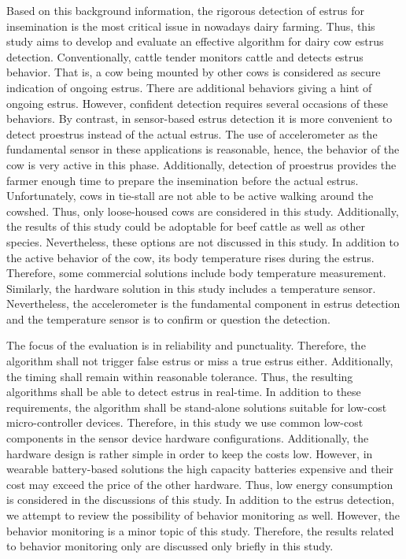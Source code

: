 \documentclass[english,12pt,a4paper,pdftex,elec,utf8]{aaltothesis}
\begin{document}
Based on this background information, the rigorous detection of estrus for insemination is the most critical issue in nowadays dairy farming. Thus, this study aims to develop and evaluate an effective algorithm for dairy cow estrus detection. Conventionally, cattle tender monitors cattle and detects estrus behavior. That is, a cow being mounted by other cows is considered as secure indication of ongoing estrus. There are additional behaviors giving a hint of ongoing estrus. However, confident detection requires several occasions of these behaviors. By contrast, in sensor-based estrus detection it is more convenient to detect proestrus instead of the actual estrus. The use of accelerometer as the fundamental sensor in these applications is reasonable, hence, the behavior of the cow is very active in this phase. Additionally, detection of proestrus provides the farmer enough time to prepare the insemination before the actual estrus. Unfortunately, cows in tie-stall are not able to be active walking around the cowshed. Thus, only loose-housed cows are considered in this study. Additionally, the results of this study could be adoptable for beef cattle as well as other species. Nevertheless, these options are not discussed in this study. In addition to the active behavior of the cow, its body temperature rises during the estrus. Therefore, some commercial solutions include body temperature measurement. Similarly, the hardware solution in this study includes a temperature sensor. Nevertheless, the accelerometer is the fundamental component in estrus detection and the temperature sensor is to confirm or question the detection.

 The focus of the evaluation is in reliability and punctuality. Therefore, the algorithm shall not trigger false estrus or miss a true estrus either. Additionally, the timing shall remain within reasonable tolerance.  Thus, the resulting algorithms shall be able to detect estrus in real-time. In addition to these requirements, the algorithm shall be stand-alone solutions suitable for low-cost micro-controller devices. Therefore, in this study we use common low-cost components in the sensor device hardware configurations. Additionally, the hardware design is rather simple in order to keep the costs low. However, in wearable battery-based solutions the high capacity batteries expensive and their cost may exceed the price of the other hardware. Thus, low energy consumption is considered in the discussions of this study. In addition to the estrus detection, we attempt to review the possibility of behavior monitoring as well. However, the behavior monitoring is a minor topic of this study. Therefore, the results related to behavior monitoring only are discussed only briefly in this study.
\end{document}
